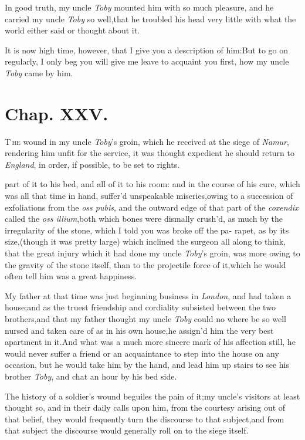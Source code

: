 \documentclass{article}
\begin{document}
In good truth, my uncle \textit{Toby} mounted him with so much
pleasure, and he carried my uncle \textit{Toby} so
well,\tsh  that he troubled his head very little with what
the world either said or thought about it.

It is now high time, however, that I give you a description of
him:\tsk  But to go on regularly, I only beg you will give me
leave to acquaint you first, how my uncle \textit{Toby} came by
him.

\section{Chap. XXV.}

\lettrine{T}{\,he} wound in my uncle
\textit{Toby}’s groin, which he received at the siege of
\textit{Namur}, rendering him unfit for the service, it was thought
expedient he should return to \textit{England}, in order, if
possible, to be set to rights.

\noindent
{}
part of it to his bed, and all of it to his room: and in the
course of his cure, which was all that time in hand, suffer’d
unspeakable miseries,\tsk  owing to a succession of exfoliations
from the \textit{oss pubis}, and the outward edge of that part of
the \textit{coxendix} called the \textit{oss illium},\tsh  both
which bones were dismally crush’d, as much by the irregularity
of the stone, which I told you was broke off the pa-\pb
rapet,\tsk
as by its size,\tsk  (though it was pretty large) which inclined
the surgeon all along to think, that the great injury which it
had done my uncle \textit{Toby}’s groin, was more owing to the
gravity of the stone itself, than to the projectile force of
it,\tsk  which he would often tell him was a great happiness.

My father at that time was just beginning business in
\textit{London}, and had taken a house;\tsk  and as the truest
friendship and cordiality subsisted between the two
brothers,\tsk  and that my father thought my uncle \textit{Toby} could no where be so well nursed
and taken care of as in his own house,\tsh  he
assign’d him the very best apartment in it.\tsk  And what
was a much more sincere mark of his affection still, he would never
suffer a friend or an acquaintance to step into the house on
any\pb
occasion, but he would take him by the hand, and lead him up stairs
to see his brother \textit{Toby}, and chat an hour by his
bed side.

The history of a soldier’s wound beguiles the pain of
it;\tsk  my uncle’s visitors at least thought so, and in
their daily calls upon him, from the courtesy arising out of that
belief, they would frequently turn the discourse to that
subject,\tsk  and from that subject the discourse would generally
roll on to the siege itself.
\end{document}

